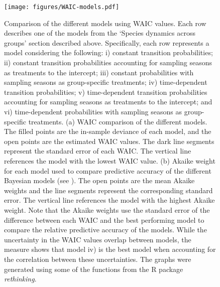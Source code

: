 \documentclass[11pt, a4paper]{article}
\begin{document}
\begin{figure}[p]
  \centering
    \vspace{0.5cm}
    \texttt{[image: figures/WAIC-models.pdf]}
	  \vspace{0.3cm}
	   \caption[WAIC models]{Comparison of the different models using WAIC values. Each row describes one of the models from the `Species dynamics across groups' section described above. Specifically, each row represents a model considering the following: i) constant transition probabilities; ii) constant transition probabilities accounting for sampling seasons as treatments to the intercept; iii) constant probabilities with sampling seasons as group-specific treatments; iv) time-dependent transition probabilities; v) time-dependent transition probabilities accounting for sampling seasons as treatments to the intercept; and vi) time-dependent probabilities with sampling seasons as group-specific treatments. (a) WAIC comparison of the different models. The filled points are the in-sample deviance of each model, and the open points are the estimated WAIC values. The dark line segments represent the standard error of each WAIC. The vertical line references the model with the lowest WAIC value. (b) Akaike weight for each model used to compare predictive accuracy of the different Bayesian models (see \citealt{mcelreath2018statisticalWAIC}). The open points are the mean Akaike weights and the line segments represent the corresponding standard error. The vertical line references the model with the highest Akaike weight. Note that the Akaike weights use the standard error of the difference between each WAIC and the best performing model to compare the relative predictive accuracy of the models. While the uncertainty in the WAIC values overlap between models, the measure shows that model iv) is the best model when accounting for the correlation between these uncertainties. The graphs were generated using some of the functions from the R package \textit{rethinking}\cite{mcelreath2018statisticalWAIC}.}
      \label{sfig:WAIC}
\end{figure}

\clearpage
\end{document}
